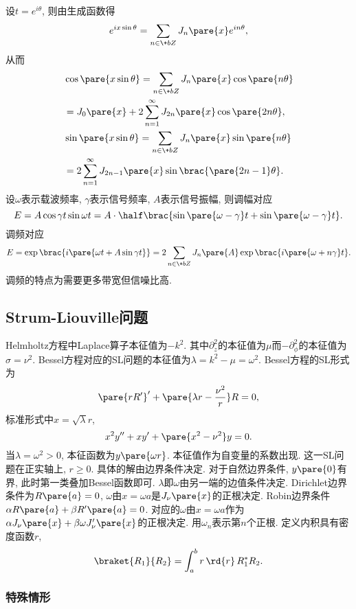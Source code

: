 \documentclass[hidelinks]{ctexart}
\begin{document}
设$t=e^{i\theta}$, 则由生成函数得
\[ e^{ix\sin\theta} = \sum_{n\in \+bZ} J_n\pare{x} e^{in\theta}, \]
从而
\begin{align*}
    & \cos\pare{x\sin\theta} = \sum_{n\in\+bZ} J_n\pare{x}\cos\pare{n\theta} \\
    & = J_0\pare{x} + 2\sum_{n=1}^\infty J_{2n}\pare{x}\cos \pare{2n\theta}, \\
    & \sin\pare{x\sin\theta} = \sum_{n\in\+bZ} J_n\pare{x}\sin\pare{n\theta} \\
    &= 2\sum_{n=1}^\infty J_{2n-1}\pare{x}\sin\brac{\pare{2n-1}\theta}.
\end{align*}
设$\omega$表示载波频率, $\gamma$表示信号频率, $A$表示信号振幅, 则调幅对应
\[ E = A \cos\gamma t \sin \omega t = A \cdot \half \brac{\sin \pare{\omega - \gamma}t + \sin\pare{\omega - \gamma} t}. \]
调频对应
\[ E = \exp\brac{i\pare{\omega t + A\sin\gamma t}} = 2\sum_{n\in \+bZ}J_n\pare{A} \exp \brac{i\pare{\omega+n\gamma}t}. \]
调频的特点为需要更多带宽但信噪比高.


\subsection{Strum-Liouville问题} %
\label{sub:strum_liouville问题}

\newpoint{}Helmholtz方程中Laplace算子本征值为$-k^2$. 其中$\partial^2_z$的本征值为$\mu$而$-\partial_\phi^2$的本征值为$\sigma = \nu^2$.
\newpoint{}Bessel方程对应的SL问题的本征值为$\lambda = k^2 - \mu = \omega^2$.
\newpoint{}Bessel方程的SL形式为
\[ \pare{rR'}' + \pare{\lambda r - \frac{\nu^2}{r}}R = 0, \]
标准形式中$x = \sqrt{\lambda}r$,
\[ x^2 y'' + xy' + \pare{x^2 - \nu^2} y = 0. \]
\newpoint{}当$\lambda = \omega^2 > 0$, 本征函数为$y\pare{\omega r}$. 本征值作为自变量的系数出现.
\newpoint{}这一SL问题在正实轴上, $r\ge 0$.
\newpoint{}具体的解由边界条件决定. 对于自然边界条件, $y\pare{0}$有界, 此时第一类叠加Bessel函数即可.
\newpoint{}$\lambda$即$\omega$由另一端的边值条件决定. Dirichlet边界条件为$R\pare{a} = 0$, $\omega$由$x = \omega a$是$J_\nu\pare{x}$的正根决定.
\newpoint{}Robin边界条件$\alpha R\pare{a} + \beta R'\pare{a} = 0$. 对应的$\omega$由$x=\omega a$作为$\alpha J_\nu\pare{x} + \beta \omega J'_\nu\pare{x}$的正根决定.
\newpoint{}用$\omega_n$表示第$n$个正根.
\newpoint{}定义内积具有密度函数$r$,
\[ \braket{R_1}{R_2} = \int_a^b r\,\rd{r}\,R_1^* R_2. \]

\subsubsection{特殊情形} %
\label{ssub:特殊情形}
\end{document}
